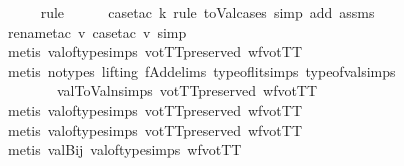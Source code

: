 \begin{isabellebody}
\ \ \ \ \isamarkupfalse%
\ rule\isanewline
\ \ \ \ \isamarkupfalse%
\ {\isacharparenleft}{\kern0pt}case{\isacharunderscore}{\kern0pt}tac\ k\ rule{\isacharcolon}{\kern0pt}\ toVal{}{}{}{}{\isachardot}{\kern0pt}cases{\isacharsemicolon}{\kern0pt}\ {\isacharparenleft}{\kern0pt}simp\ add{\isacharcolon}{\kern0pt}\ assms{\isacharparenright}{\kern0pt}{\isacharparenright}{\kern0pt}\isanewline
\ \ \ \ \isamarkupfalse%
\ {\isacharparenleft}{\kern0pt}rename{\isacharunderscore}{\kern0pt}tac\ v{\isacharcomma}{\kern0pt}\ case{\isacharunderscore}{\kern0pt}tac\ v{\isacharsemicolon}{\kern0pt}\ simp{\isacharparenright}{\kern0pt}\isanewline
\ \ \ \ \isamarkupfalse%
\ {\isacharparenleft}{\kern0pt}metis\ val{\isacharunderscore}{\kern0pt}of{\isacharunderscore}{\kern0pt}type{\isachardot}{\kern0pt}simps\ votTTpreserved\ wfvotTT{\isacharparenright}{\kern0pt}\isanewline
\ \ \ \ \isamarkupfalse%
\ {\isacharparenleft}{\kern0pt}metis\ {\isacharparenleft}{\kern0pt}no{\isacharunderscore}{\kern0pt}types{\isacharcomma}{\kern0pt}\ lifting{\isacharparenright}{\kern0pt}\ fAdd{}{\isachardot}{\kern0pt}elims\ type{\isacharunderscore}{\kern0pt}of{\isacharunderscore}{\kern0pt}lit{\isachardot}{\kern0pt}simps{\isacharparenleft}{\kern0pt}{}{\isacharparenright}{\kern0pt}\ type{\isacharunderscore}{\kern0pt}of{\isacharunderscore}{\kern0pt}val{\isachardot}{\kern0pt}simps{\isacharparenleft}{\kern0pt}{}{\isacharparenright}{\kern0pt}\isanewline
\ \ \ \ \ \ \ \ val{}ToValn{\isachardot}{\kern0pt}simps{\isacharparenleft}{\kern0pt}{}{\isacharparenright}{\kern0pt}\ votTTpreserved\ wfvotTT{\isacharparenright}{\kern0pt}\isanewline
\ \ \ \ \isamarkupfalse%
\ {\isacharparenleft}{\kern0pt}metis\ val{\isacharunderscore}{\kern0pt}of{\isacharunderscore}{\kern0pt}type{\isachardot}{\kern0pt}simps\ votTTpreserved\ wfvotTT{\isacharparenright}{\kern0pt}\isanewline
\ \ \ \ \isamarkupfalse%
\ {\isacharparenleft}{\kern0pt}metis\ val{\isacharunderscore}{\kern0pt}of{\isacharunderscore}{\kern0pt}type{\isachardot}{\kern0pt}simps\ votTTpreserved\ wfvotTT{\isacharparenright}{\kern0pt}\isanewline
\ \ \ \ \isamarkupfalse%
\ {\isacharparenleft}{\kern0pt}metis\ valBij{}\ val{\isacharunderscore}{\kern0pt}of{\isacharunderscore}{\kern0pt}type{\isachardot}{\kern0pt}simps\ wfvotTT{\isacharparenright}{\kern0pt}{\isacharplus}{\kern0pt}\isanewline
\ \ \ \ \isamarkupfalse%

\end{isabellebody}
